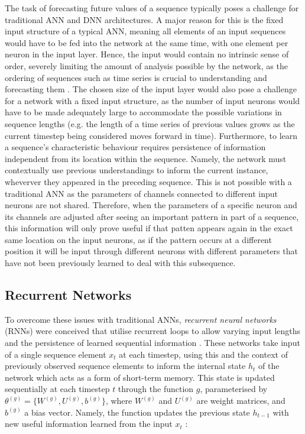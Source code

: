\documentclass[a4paper, 11pt]{report}
\begin{document}
    The task of forecasting future values of a sequence typically poses a challenge for traditional ANN and DNN architectures. A major reason for this is the fixed input structure of a typical ANN, meaning all elements of an input sequences would have to be fed into the network at the same time, with one element per neuron in the input layer. Hence, the input would contain no intrinsic sense of order, severely limiting the amount of analysis possible by the network, as the ordering of sequences such as time series is crucial to understanding and forecasting them \citep{tsantekidis-2022}. The chosen size of the input layer would also pose a challenge for a network with a fixed input structure, as the number of input neurons would have to be made adequately large to accommodate the possible variations in sequence lengths (e.g. the length of a time series of previous values grows as the current timestep being considered moves forward in time). Furthermore, to learn a sequence’s characteristic behaviour requires persistence of information independent from its location within the sequence. Namely, the network must contextually use previous understandings to inform the current instance, wheverver they appeared in the preceding sequence. This is not possible with a traditional ANN as the parameters of channels connected to different input neurons are not shared. Therefore, when the parameters of a specific neuron and its channels are adjusted after seeing an important pattern in part of a sequence, this information will only prove useful if that patten appears again in the exact same location on the input neurons, as if the pattern occurs at a different position it will be input through different neurons with different parameters that have not been previously learned to deal with this subsequence.


    \subsection{Recurrent Networks}

    To overcome these issues with traditional ANNs, \emph{recurrent neural networks} (RNNs) were conceived that utilise recurrent loops to allow varying input lengths and the persistence of learned sequential information \citep{sharma-2022}. These networks take input of a single sequence element $x_t$ at each timestep, using this and the context of previously observed sequence elements to inform the internal state $h_t$ of the network which acts as a form of short-term memory. This state is updated sequentially at each timestep $t$ through the function $g$, parameterised by $\theta^{(g)} = \{ W^{(g)}, U^{(g)}, b^{(g)} \}$, where $W^{(g)}$ and $U^{(g)}$ are weight matrices, and $b^{(g)}$ a bias vector. Namely, the function updates the previous state $h_{t-1}$ with new useful information learned from the input $x_t$ \citep{sharma-2022}:
\end{document}
